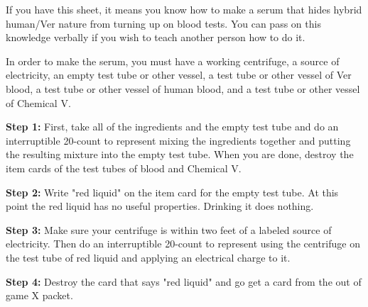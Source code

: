 \documentclass[green]{guildcamp4}
\begin{document}
\name{\gSerum{}}

If you have this sheet, it means you know how to make a serum that hides hybrid human/Ver nature from turning up on blood tests. You can pass on this knowledge verbally if you wish to teach another person how to do it.

In order to make the serum, you must have a working centrifuge, a source of electricity, an empty test tube or other vessel, a test tube or other vessel of Ver blood, a test tube or other vessel of human blood, and a test tube or other vessel of Chemical V.

{\bf Step 1:} First, take all of the ingredients and the empty test tube and do an interruptible 20-count to represent mixing the ingredients together and putting the resulting mixture into the empty test tube. When you are done, destroy the item cards of the test tubes of blood and Chemical V.

{\bf Step 2:} Write "red liquid" on the item card for the empty test tube. At this point the red liquid has no useful properties. Drinking it does nothing.

{\bf Step 3:} Make sure your centrifuge is within two feet of a labeled source of electricity. Then do an interruptible 20-count to represent using the centrifuge on the test tube of red liquid and applying an electrical charge to it.

{\bf Step 4:} Destroy the card that says "red liquid" and go get a \iSerum{} card from the out of game X packet. 
\end{document}
